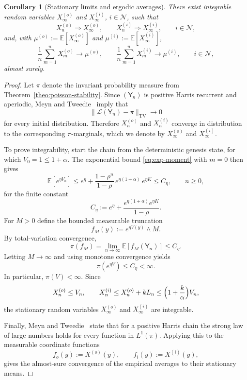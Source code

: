 \documentclass[a4paper,12pt,oneside,reqno]{amsart}
\newcommand{\Nodes}{{\mathcal N}}
\newcommand{\E}{{\mathbb E}}
\newcommand{\1}{{\mathbf 1}}
\newtheorem{cor}[theo]{Corollary}
\begin{document}
\begin{cor}[Stationary limits and ergodic averages]\label{cor:regenerative-ergodic}
There exist integrable random variables $X_\infty^{(o)}$ and $X_\infty^{(i)}$, $i\in\Nodes$, such that
\[
   X_n^{(o)} \Longrightarrow X_\infty^{(o)},
   \qquad
   X_n^{(i)} \Longrightarrow X_\infty^{(i)},
   \qquad i\in\Nodes,
\]
and, with $\mu^{(o)}:=\E[X_\infty^{(o)}]$ and $\mu^{(i)}:=\E[X_\infty^{(i)}]$,
\[
   \frac1n\sum_{m=1}^n X_m^{(o)} \longrightarrow \mu^{(o)},
   \qquad
   \frac1n\sum_{m=1}^n X_m^{(i)} \longrightarrow \mu^{(i)},
   \qquad i\in\Nodes,
\]
almost surely.
\end{cor}

\begin{proof}
Let $\pi$ denote the invariant probability measure from Theorem~\ref{theo:poisson-stability}. Since $(\mathsf{Y}_n)$ is positive Harris recurrent and aperiodic, Meyn and Tweedie~\cite[Theorem~13.3.3]{MeynTweedie2009} imply that
\[
   \|\mathcal{L}(\mathsf{Y}_n)-\pi\|_{\mathrm{TV}}\to 0
\]
for every initial distribution. Therefore $X_n^{(o)}$ and $X_n^{(i)}$ converge in distribution to the corresponding $\pi$-marginals, which we denote by $X_\infty^{(o)}$ and $X_\infty^{(i)}$.

To prove integrability, start the chain from the deterministic genesis state, for which $V_0=1\le 1+\alpha$. The exponential bound \eqref{eq:exp-moment} with $m=0$ then gives
\[
   \E[e^{\eta V_n}]
   \le e^{\eta} + \frac{1-\rho^n}{1-\rho}\,e^{\eta(1+\alpha)}\,e^{\eta K}
   \le C_\eta,
   \qquad n\ge 0,
\]
for the finite constant
\[
   C_\eta:= e^{\eta} + \frac{e^{\eta(1+\alpha)}e^{\eta K}}{1-\rho}.
\]
For $M>0$ define the bounded measurable truncation
\[
   f_M(y):=e^{\eta V(y)}\wedge M.
\]
By total-variation convergence,
\[
   \pi(f_M)=\lim_{n\to\infty}\E[f_M(\mathsf{Y}_n)]\le C_\eta.
\]
Letting $M\to\infty$ and using monotone convergence yields
\[
   \pi(e^{\eta V})\le C_\eta<\infty.
\]
In particular, $\pi(V)<\infty$. Since
\[
   X_n^{(o)}\le V_n,
   \qquad
   X_n^{(i)}\le X_n^{(o)}+kL_n\le \Bigl(1+\frac{k}{\alpha}\Bigr)V_n,
\]
the stationary random variables $X_\infty^{(o)}$ and $X_\infty^{(i)}$ are integrable.

Finally, Meyn and Tweedie~\cite[Theorem~17.1.7]{MeynTweedie2009} state that for a positive Harris chain the strong law of large numbers holds for every function in $L^1(\pi)$. Applying this to the measurable coordinate functions
\[
   f_o(y):=X^{(o)}(y),
   \qquad
   f_i(y):=X^{(i)}(y),
\]
gives the almost-sure convergence of the empirical averages to their stationary means.
\end{proof}
\end{document}

